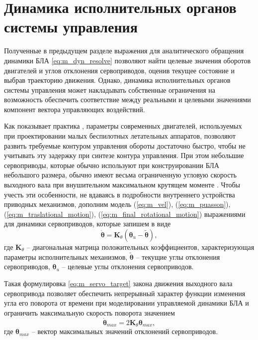 \section{Динамика исполнительных органов системы управления}

Полученные в предыдущем разделе выражения для аналитического обращения динамики БЛА \eqref{eq:m_dyn_resolve} позволяют найти целевые значения оборотов двигателей и углов отклонения сервоприводов, оценив текущее состояние и выбрав траекторию движения.
Однако, динамика исполнительных органов системы управления может накладывать собственные ограничения на возможность обеспечить соответствие между реальными и целевыми значениями компонент вектора управляющих воздействий.

Как показывает практика \cite{Ryll01, Mellinger01}, параметры современных двигателей, используемых при проектировании малых беспилотных летательных аппаратов, позволяют развить требуемые контуром управления обороты достаточно быстро, чтобы не учитывать эту задержку при синтезе контура управления.
При этом небольшие сервоприводы, которые обычно используют при конструировании БЛА небольшого размера, обычно имеют весьма ограниченную угловую скорость выходного вала при внушительном максимальном крутящем моменте \cite{RobotShop}. Чтобы учесть эти особенности, не вдаваясь в подробности внутреннего устройства приводных механизмов, дополним модель
(\ref{eq:m_vel}),
(\ref{eq:m_puasson}),
(\ref{eq:m_traslational_motion}), (\ref{eq:m_final_rotational_motion})
выражениями для динамики сервоприводов, которые запишем в виде
\begin{equation} \label{eq:m_servo_target}
\dot{\bm{\theta}} = \bm{K}_{\theta} (\bm{\theta}_{u} - \bm{\tilde \theta}),
\end{equation}
где 
$\bm{K}_{\theta}$ -- диагональная матрица положительных коэффициентов,
характеризующая параметры исполнительных механизмов,
$\bm{\tilde \theta}$ -- текущие углы отклонения сервоприводов,
$\bm{\theta}_{u}$ -- целевые углы отклонения сервоприводов.

Такая формулировка \eqref{eq:m_servo_target} закона движения выходного вала сервопривода позволяет обеспечить непрерывный характер функции изменения угла его поворота от времени при моделировании управляемой динамики БЛА и ограничить максимальную скорость поворота значением
\begin{equation} \label{eq:m_servo_dot_max}
\dot{\bm{\theta}}_{max} =
2 \bm{K}_{\theta}
\bm{\theta}_{max},
\end{equation}
где  $\bm{\theta}_{max}$ -- вектор максимальных значений отклонений сервоприводов.


